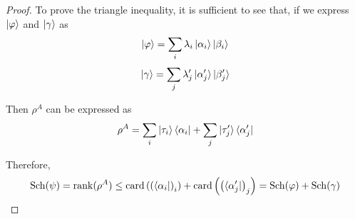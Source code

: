 \documentclass[../main.tex]{subfiles}
\begin{document}
\begin{enumerate}
\begin{proof}
    To prove the triangle inequality, it is sufficient to see that, if we express $\ket{\varphi}$ and $\ket{\gamma}$ as
    \begin{equation*}
        \ket{\varphi}=\sum_i \lambda_i\ket{\alpha_i}\ket{\beta_i}
    \end{equation*}
    \begin{equation*}
        \ket{\gamma}=\sum_j \lambda^\prime_j\ket{\alpha^\prime_j}\ket{\beta^\prime_j}
    \end{equation*}
    
    Then $\rho^A$ can be expressed as
    \begin{equation*}
        \rho^A=\sum_i \ket{\tau_i}\bra{\alpha_i}+\sum_j \ket{\tau^\prime_j}\bra{\alpha^\prime_j}
    \end{equation*}
    
    Therefore,
    \begin{equation*}
        \mathrm{Sch}(\psi)=\mathrm{rank}(\rho^A)\leq\mathrm{card}\left(\left(\bra{\alpha_i}\right)_i\right)+\mathrm{card}\left(\left(\bra{\alpha^\prime_j}\right)_j\right)=\mathrm{Sch}(\varphi)+\mathrm{Sch}(\gamma)
    \end{equation*}
    \end{proof}
\end{enumerate}
\end{document}
